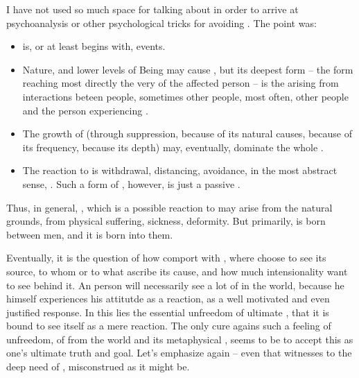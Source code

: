 {\pa\label{pa:evilpoints}
I have not used so much space for talking about  in order to
arrive at psychoanalysis or other psychological tricks for avoiding
.  The point was: 
\begin{itemize}
\item {} is, or at least begins with, 
 events.  
\item Nature, and lower levels of Being may cause
, but its deepest form -- the form reaching most directly the
very  of the affected person -- is the  arising 
from interactions beteen people, sometimes other people, most often, 
other people and the person experiencing .
\item The growth of  (through suppression, because of its 
natural causes, because of its frequency, because its depth) may, eventually, 
dominate the whole .
\item The reaction to  is withdrawal, distancing, avoidance, in the most 
abstract sense, . Such a form of , however, is 
just a passive \No.
\end{itemize}

\pa
Thus, in general, , which is a possible reaction to 
may arise from the natural grounds, from physical suffering, sickness,
deformity.  But primarily,  is born between men, and it is
born into them.

Eventually, it is the question of how  comport with , 
where  choose to see its source, to whom or to what  
ascribe its cause, and how much intensionality  want to see 
behind it. An  person will necessarily see a lot of 
 in the world, because he himself experiences his attitutde 
as a reaction, as a well motivated and even justified response. In this 
lies the essential unfreedom of ultimate , that it is bound 
to see itself as a mere reaction. The only cure agains such a feeling 
of unfreedom, of  from the world and 
its metaphysical , seems to be to accept this  as one's 
ultimate truth and goal. Let's emphasize again -- even that 
witnesses to the deep need of , misconstrued as it 
might be.

}
